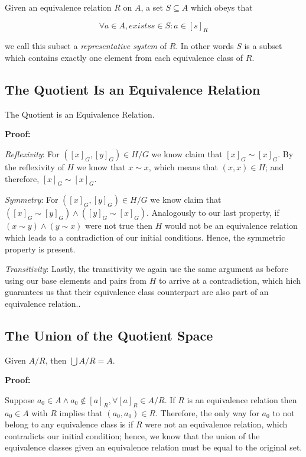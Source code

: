 Given an equivalence relation \(R\) on \(A\), a set  \(S \subseteq A\) which obeys that

\[
	\forall a \in A, \!exists s \in S: a \in [s]_R
\]

we call this subset a \emph{representative system} of \(R\). In other words
\(S\) is a subset which contains exactly one element from each equivalence class of \(R\).

\subsection{The Quotient Is an Equivalence Relation}

The Quotient is an Equivalence Relation.

\textbf{Proof:}

\emph{Reflexivity}: For \(([x]_{G}, [y]_{G}) \in H/G\) we know claim that \([x]_{G} \sim [x]_{G}\). By the reflexivity
of \(H\) we know that \(x \sim x\), which means that \((x, x) \in H\); and therefore, \([x]_{G} \sim [x]_{G}\).

\emph{Symmetry}: For \(([x]_{G}, [y]_{G}) \in H/G\) we know claim that \(([x]_{G} \sim [y]_{G}) \land ([y]_{G} \sim [x]_{G})\). Analogously to our last property,
if \((x \sim y) \land (y \sim x)\) were not true then \(H\) would not be an equivalence relation which leads to a contradiction of our initial conditions. Hence,
the symmetric property is present.

\emph{Transitivity}: Lastly, the transitivity we again use the same argument as before using our base elements and pairs from \(H\) to arrive at a contradiction, which hich
guarantees us that their equivalence class counterpart are also part of an equivalence relation..

\QED

\subsection{The Union of the Quotient Space}

Given \(A/R\), then \(\bigcup A/R = A\).

\textbf{Proof:}

Suppose \(a_0 \in A \land a_0 \notin [a]_R, \forall [a]_R \in A/R\). If \(R\) is an equivalence relation then
\( a_0 \in A\) with \(R\) implies that \((a_0, a_0) \in R\). Therefore, the only way for \(a_0\) to not belong to any equivalence class is if \(R\)
were not an equivalence relation, which contradicts our initial condition; hence, we know that the union of the equivalence classes
given an equivalence relation must be equal to the original set.

